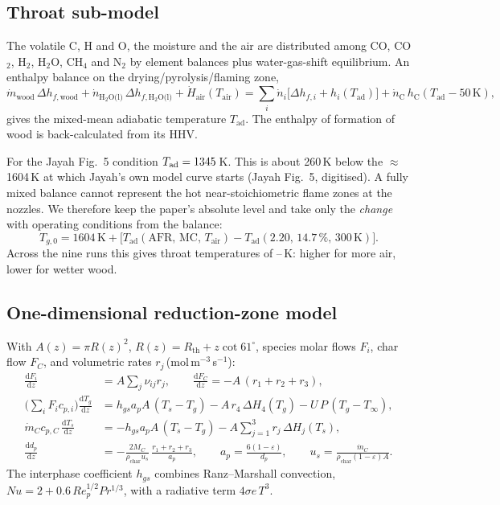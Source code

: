 \documentclass[11pt,a4paper]{article}
\newcommand{\dd}{\mathrm{d}}
\begin{document}
\subsection{Throat sub-model}
The volatile C, H and O, the moisture and the air are distributed among CO, CO$_2$, H$_2$, H$_2$O, CH$_4$ and N$_2$ by element balances plus water-gas-shift equilibrium. An enthalpy balance on the drying/pyrolysis/flaming zone,
\begin{equation}
\dot m_\text{wood}\,\Delta h_{f,\text{wood}} + \dot n_\text{H$_2$O(l)}\,\Delta h_{f,\text{H$_2$O(l)}} + \dot H_\text{air}(T_\text{air}) = \sum_i \dot n_i\big[\Delta h_{f,i} + h_i(T_\text{ad})\big] + \dot n_\text{C}\,h_\text{C}(T_\text{ad}-50\,\text{K}),
\end{equation}
gives the mixed-mean adiabatic temperature $T_\text{ad}$. The enthalpy of formation of wood is back-calculated from its HHV.

For the Jayah Fig.~5 condition $T_\text{ad}=1345$\,K. This is about 260\,K below the $\approx$1604\,K at which Jayah's own model curve starts (Jayah Fig.~5, digitised). A fully mixed balance cannot represent the hot near-stoichiometric flame zones at the nozzles. We therefore keep the paper's absolute level and take only the \emph{change} with operating conditions from the balance:
\begin{equation}
T_{g,0} = 1604\,\text{K} + \big[T_\text{ad}(\text{AFR},\,\text{MC},\,T_\text{air}) - T_\text{ad}(2.20,\,14.7\,\%,\,300\,\text{K})\big].
\label{eq:anchor}
\end{equation}
Across the nine runs this gives throat temperatures of \RRunTthroatMin--\RRunTthroatMax\,K: higher for more air, lower for wetter wood.

\subsection{One-dimensional reduction-zone model}
With $A(z)=\pi R(z)^2$, $R(z)=R_\text{th}+z\cot 61^\circ$, species molar flows $F_i$, char flow $F_C$, and volumetric rates $r_j$\,(mol\,m$^{-3}$\,s$^{-1}$):
\begin{align}
\frac{\dd F_i}{\dd z} &= A\sum_j \nu_{ij} r_j, \qquad \frac{\dd F_C}{\dd z} = -A\,(r_1+r_2+r_3),\\
\Big(\sum_i F_i c_{p,i}\Big)\frac{\dd T_g}{\dd z} &= h_{gs}a_p A\,(T_s-T_g) - A\,r_4\,\Delta H_4(T_g) - U\,P\,(T_g-T_\infty),\\
\dot m_C c_{p,C}\,\frac{\dd T_s}{\dd z} &= -h_{gs}a_p A\,(T_s-T_g) - A\sum_{j=1}^{3} r_j\,\Delta H_j(T_s),\\
\frac{\dd d_p}{\dd z} &= -\frac{2M_C}{\rho_\text{char}u_s}\,\frac{r_1+r_2+r_3}{a_p}, \qquad a_p=\frac{6(1-\varepsilon)}{d_p}, \qquad u_s=\frac{\dot m_C}{\rho_\text{char}(1-\varepsilon)A}.
\end{align}
The interphase coefficient $h_{gs}$ combines Ranz--Marshall convection, $Nu=2+0.6\,Re_p^{1/2}Pr^{1/3}$, with a radiative term $4\sigma e\,T^3$.
\end{document}
